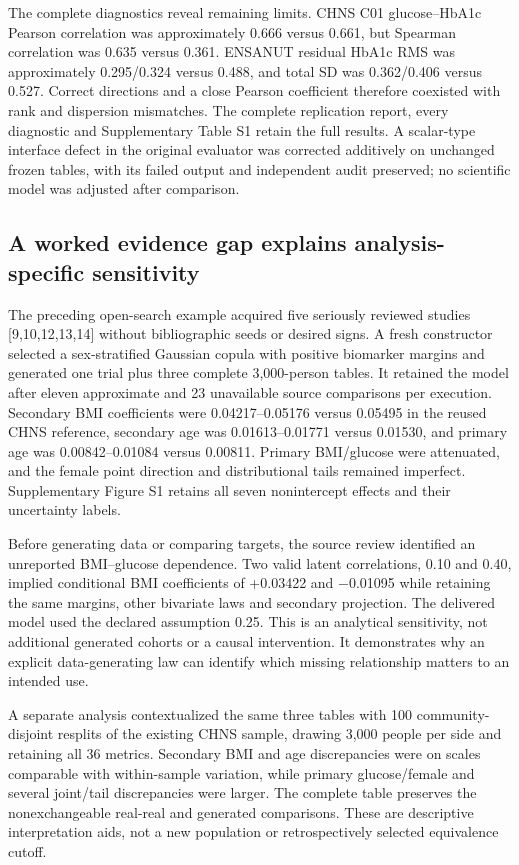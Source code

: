 \documentclass[10pt,twocolumn]{article}
\begin{document}
The complete diagnostics reveal remaining limits. CHNS C01 glucose–HbA1c Pearson correlation was approximately 0.666 versus 0.661, but Spearman correlation was 0.635 versus 0.361. ENSANUT residual HbA1c RMS was approximately 0.295/0.324 versus 0.488, and total SD was 0.362/0.406 versus 0.527. Correct directions and a close Pearson coefficient therefore coexisted with rank and dispersion mismatches. The complete replication report, every diagnostic and Supplementary Table S1 retain the full results. A scalar-type interface defect in the original evaluator was corrected additively on unchanged frozen tables, with its failed output and independent audit preserved; no scientific model was adjusted after comparison.


\subsection{A worked evidence gap explains analysis-specific sensitivity}

The preceding open-search example acquired five seriously reviewed studies [9,10,12,13,14] without bibliographic seeds or desired signs. A fresh constructor selected a sex-stratified Gaussian copula with positive biomarker margins and generated one trial plus three complete 3,000-person tables. It retained the model after eleven approximate and 23 unavailable source comparisons per execution. Secondary BMI coefficients were 0.04217–0.05176 versus 0.05495 in the reused CHNS reference, secondary age was 0.01613–0.01771 versus 0.01530, and primary age was 0.00842–0.01084 versus 0.00811. Primary BMI/glucose were attenuated, and the female point direction and distributional tails remained imperfect. Supplementary Figure S1 retains all seven nonintercept effects and their uncertainty labels.


Before generating data or comparing targets, the source review identified an unreported BMI–glucose dependence. Two valid latent correlations, 0.10 and 0.40, implied conditional BMI coefficients of +0.03422 and −0.01095 while retaining the same margins, other bivariate laws and secondary projection. The delivered model used the declared assumption 0.25. This is an analytical sensitivity, not additional generated cohorts or a causal intervention. It demonstrates why an explicit data-generating law can identify which missing relationship matters to an intended use.


A separate analysis contextualized the same three tables with 100 community-disjoint resplits of the existing CHNS sample, drawing 3,000 people per side and retaining all 36 metrics. Secondary BMI and age discrepancies were on scales comparable with within-sample variation, while primary glucose/female and several joint/tail discrepancies were larger. The complete table preserves the nonexchangeable real-real and generated comparisons. These are descriptive interpretation aids, not a new population or retrospectively selected equivalence cutoff.
\end{document}
